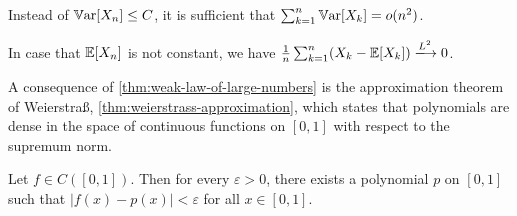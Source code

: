 \begin{remark}
Instead of $\operatorname{\mathbb{V}ar}[X_n] \leq C$, it is sufficient that $\sum_{k=1}^n \operatorname{\mathbb{V}ar}[X_k] = o(n^2)$.

In case that $\operatorname{\mathbb{E}}[X_n]$ is not constant, we have $\frac{1}{n}\sum_{k=1}^n (X_k - \Exp[X_k]) \xlongrightarrow{{L^2}} 0$.
\end{remark}


A consequence of \autoref{thm:weak-law-of-large-numbers} is the approximation theorem of Weierstraß, \autoref{thm:weierstrass-approximation}, which states that polynomials are dense in the space of continuous functions on $[0,1]$ with respect to the supremum norm.

\begin{theorem}\label{thm:weierstrass-approximation}
Let $f \in C([0,1])$.
Then for every $\varepsilon > 0$, there exists a polynomial $p$ on $[0,1]$ such that
$
|f(x)-p(x)|
<
\varepsilon
$
for all $x \in [0,1]$.
\end{theorem}


